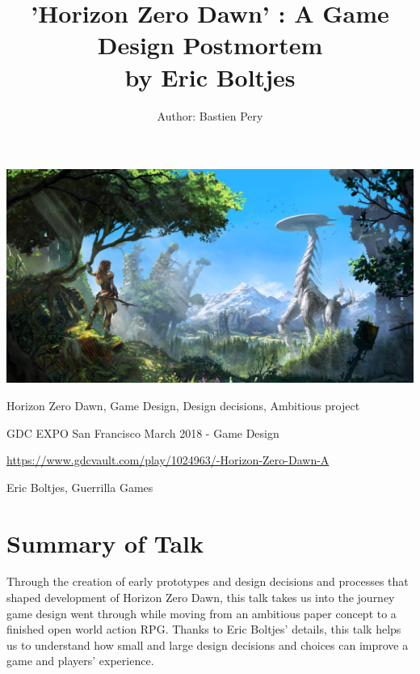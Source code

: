 \documentclass[a4paper]{article}
\title{'Horizon Zero Dawn' : A Game Design Postmortem \\by Eric Boltjes}
\author{Author: Bastien Pery}
\begin{document}
\maketitle

\begin{center}
  \includegraphics{Horizon.jpg}
\end{center}
\vspace{1em}

\begin{keywords} Horizon Zero Dawn, Game Design, Design decisions, Ambitious project \end{keywords}

\begin{track} GDC EXPO San Francisco March 2018 - Game Design \end{track}

\begin{talkurl}  \url{https://www.gdcvault.com/play/1024963/-Horizon-Zero-Dawn-A} \end{talkurl}

\begin{speaker}Eric Boltjes, Guerrilla Games \end{speaker}


\begin{abstract}
\end{abstract}

\section{Summary of Talk}


Through the creation of early prototypes and design decisions and processes that shaped
development of Horizon Zero Dawn, this talk takes us into the journey game design went through while 
moving from an ambitious paper concept to a finished open world action RPG. Thanks to Eric Boltjes'
details, this talk helps us to understand how small and large design decisions and choices can 
improve a game and players' experience.
\end{document}
